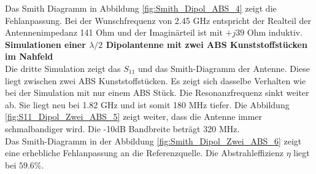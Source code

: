 Das Smith Diagramm in Abbildung \ref{fig:Smith_Dipol_ABS_4} zeigt die Fehlanpassung. Bei der Wunschfrequenz von 2.45 GHz entspricht der Realteil der Antennenimpedanz 141 Ohm und der Imaginärteil ist mit $+j39$ Ohm induktiv.\\
\textbf{Simulationen einer $\lambda/2$ Dipolantenne mit zwei ABS Kunststoffstücken im Nahfeld}\\

Die dritte Simulation zeigt das $S_{11}$ und das Smith-Diagramm der Antenne. Diese liegt zwischen zwei ABS Kunststoffstücken. Es zeigt sich dasselbe Verhalten wie bei der Simulation mit nur einem ABS Stück. Die Resonanzfrequenz sinkt weiter ab. Sie liegt neu bei 1.82 GHz und ist somit 180 MHz tiefer. Die Abbildung  \ref{fig:S11_Dipol_Zwei_ABS_5} zeigt weiter, dass die Antenne immer schmalbandiger wird. Die -10dB Bandbreite beträgt 320 MHz.\\
Das Smith-Diagramm in der Abbildung \ref{fig:Smith_Dipol_Zwei_ABS_6} zeigt eine erhebliche Fehlanpassung an die Referenzquelle. Die Abstrahleffizienz $\eta$ liegt  bei $59.6 \%$.




\clearpage
\newpage

